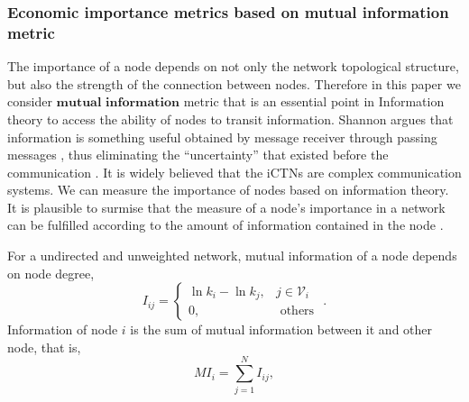 \documentclass[preprint,3p,times,sort&compress]{elsarticle}
\begin{document}
\subsubsection{Economic importance metrics based on mutual information metric}

The importance of a node depends on not only the network topological structure, but also the strength of the connection between nodes. Therefore in this paper we consider $\textbf{mutual information}$ metric that is an essential point in Information theory to access the ability of nodes to transit information. Shannon argues that information is something useful obtained by message receiver through passing messages , thus eliminating the ``uncertainty'' that existed before the communication \cite{Borst-Theunissen-1999-NatNeurosci}. It is widely believed that the iCTNs are complex communication systems. We can measure the importance of nodes based on information theory. It is plausible to surmise that the measure of a node's importance in a network can be fulfilled according to the amount of information contained in the node \cite{Liu-Jin-Zhang-Xu-2014-JSupercomput}.


For a undirected and unweighted network, mutual information of a node depends on node degree,
\begin{equation}
I_{ij}= \begin{cases}\ln k_{i}-\ln k_{j}, &j
\in \mathscr{V}_i \\ 0, & \text { others }\end{cases}.
\label{Eq:mutual:information:node}
\end{equation}
Information of node $i$ is the sum of mutual information between it and other node, that is,
\begin{equation}
MI_i=\sum_{j=1}^{N} I_{ij},
\label{Eq:mutual:information:undirected}
\end{equation}
\end{document}
